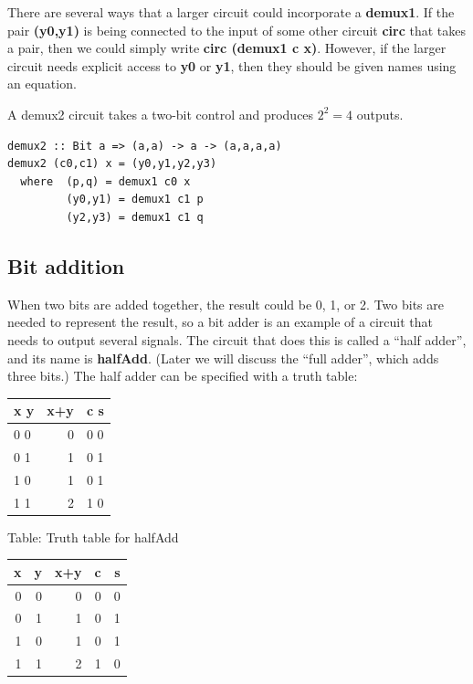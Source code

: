 \documentclass[]{svmono}
\begin{document}
There are several ways that a larger circuit could incorporate a
\textbf{demux1}.  If the pair \textbf{(y0,y1)} is being connected to the input of
some other circuit \textbf{circ} that takes a pair, then we could simply
write \textbf{circ (demux1 c x)}.  However, if the larger circuit needs
explicit access to \textbf{y0} or \textbf{y1}, then they should be given names using
an equation.

A demux2 circuit takes a two-bit control and produces \(2^{2} = 4\)
outputs.


\begin{verbatim}
demux2 :: Bit a => (a,a) -> a -> (a,a,a,a)
demux2 (c0,c1) x = (y0,y1,y2,y3)
  where  (p,q) = demux1 c0 x
         (y0,y1) = demux1 c1 p
         (y2,y3) = demux1 c1 q
\end{verbatim}
\subsection*{Bit addition}
\label{sec:orgc934c53}

When two bits are added together, the result could be 0, 1, or 2.  Two
bits are needed to represent the result, so a bit adder is an example
of a circuit that needs to output several signals.  The circuit that
does this is called a ``half adder'', and its name is \textbf{halfAdd}.
(Later we will discuss the ``full adder'', which adds three bits.)
The half adder can be specified with a truth table:

\begin{center}
\begin{tabular}{lrl}
x  y & x+y & c  s\\
\hline
0  0 & 0 & 0  0\\
0  1 & 1 & 0  1\\
1  0 & 1 & 0  1\\
1  1 & 2 & 1  0\\
\end{tabular}
\end{center}

Table: Truth table for halfAdd

\begin{center}
\begin{tabular}{rrrrr}
x & y & x+y & c & s\\
\hline
0 & 0 & 0 & 0 & 0\\
0 & 1 & 1 & 0 & 1\\
1 & 0 & 1 & 0 & 1\\
1 & 1 & 2 & 1 & 0\\
\end{tabular}
\end{center}
\end{document}
